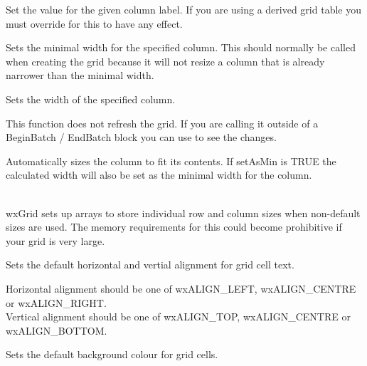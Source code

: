 {Set the value for the given column label. If you are using a derived grid table you must 
override 
for this to have any effect.

\label{wxgridsetcolminimalwidth}


Sets the minimal width for the specified column. This should normally be called when creating the grid
because it will not resize a column that is already narrower than the minimal width.

\label{wxgridsetcolsize}


Sets the width of the specified column. 

This function does not refresh the grid. If you are calling it outside of a BeginBatch / EndBatch
block you can use  to see the changes. 

Automatically sizes the column to fit its contents.  If setAsMin is TRUE the calculated width will
also be set as the minimal width for the column.

 \\
wxGrid sets up arrays to store individual row and column sizes when non-default sizes are used.
The memory requirements for this could become prohibitive if your grid is very large. 

\label{wxgridsetdefaultcellalignment}


Sets the default horizontal and vertial alignment for grid cell text.

Horizontal alignment should be one of wxALIGN_LEFT, wxALIGN_CENTRE or wxALIGN_RIGHT. \\
Vertical alignment should be one of wxALIGN_TOP, wxALIGN_CENTRE or wxALIGN_BOTTOM.

\label{wxgridsetdefaultcellbackgroundcolour}


Sets the default background colour for grid cells.

}

